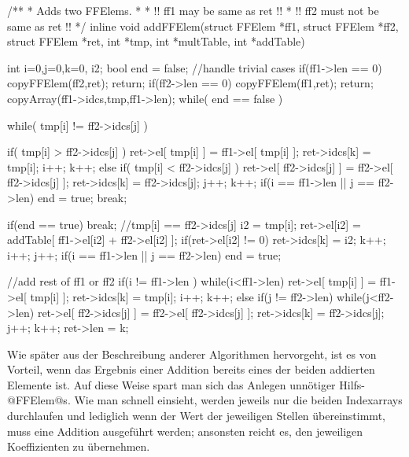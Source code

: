\begin{ccode}[caption={[\texttt{void addFFElem} aus 
 \url{../Sage/enumeratePCNs.c}]Aus \url{../Sage/enumeratePCNs.c}}]
/**
 * Adds two FFElems.
 *
 * !! ff1 may be same as ret !!
 * !! ff2 must not be same as ret !!
 */
inline void addFFElem(struct FFElem *ff1, struct FFElem *ff2,
        struct FFElem *ret,
        int *tmp,
        int *multTable, int *addTable){
    int i=0,j=0,k=0, i2;
    bool end = false;
    //handle trivial cases
    if(ff1->len == 0){
        copyFFElem(ff2,ret);
        return;
    }
    if(ff2->len == 0){
        copyFFElem(ff1,ret);
        return;
    }
    copyArray(ff1->idcs,tmp,ff1->len);
    while( end == false ){
        while( tmp[i] != ff2->idcs[j] ){
            if( tmp[i] > ff2->idcs[j] ){
                ret->el[ tmp[i] ] = ff1->el[ tmp[i] ];
                ret->idcs[k] = tmp[i];
                i++; k++;
            }else if( tmp[i] < ff2->idcs[j] ){
                ret->el[ ff2->idcs[j] ] = ff2->el[ ff2->idcs[j] ];
                ret->idcs[k] = ff2->idcs[j];
                j++; k++;
            }
            if(i == ff1->len || j == ff2->len){
                end = true;
                break;
            }

        }
        if(end == true) break;
        //tmp[i] == ff2->idcs[j]
        i2 = tmp[i];
        ret->el[i2] = addTable[ ff1->el[i2] + ff2->el[i2] ];
        if(ret->el[i2] != 0){
            ret->idcs[k] = i2;
            k++;
        }
        i++; j++;
        if(i == ff1->len || j == ff2->len) end = true;
    }
    //add rest of ff1 or ff2
    if(i != ff1->len ){
        while(i<ff1->len){
            ret->el[ tmp[i] ] = ff1->el[ tmp[i] ];
            ret->idcs[k] = tmp[i];
            i++; k++;
        }
    }else if(j != ff2->len){
        while(j<ff2->len){
            ret->el[ ff2->idcs[j] ] = ff2->el[ ff2->idcs[j] ];
            ret->idcs[k] = ff2->idcs[j];
            j++; k++;
        }
    }
    ret->len = k;
}
\end{ccode}  

Wie später aus der Beschreibung anderer Algorithmen hervorgeht, ist es von
Vorteil, wenn das Ergebnis einer Addition bereits eines der beiden addierten
Elemente ist. Auf diese Weise spart man sich das Anlegen unnötiger Hilfs-@FFElem@s.
Wie man schnell einsieht, werden jeweils nur die beiden Indexarrays durchlaufen
und lediglich wenn der Wert der jeweiligen Stellen übereinstimmt, muss eine
Addition ausgeführt werden; ansonsten reicht es, den jeweiligen Koeffizienten 
zu übernehmen.


